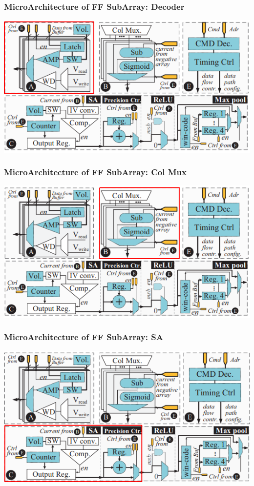 \documentclass[hyperref={colorlinks}]{beamer}
\begin{document}
\begin{frame}
	\frametitle{MicroArchitecture of FF SubArray: Decoder}
	\includegraphics[scale=0.4, center]{decoder1.png}
\end{frame}

\begin{frame}
	\frametitle{MicroArchitecture of FF SubArray: Col Mux}
	\includegraphics[scale=0.4, center]{col.png}
\end{frame}

\begin{frame}
	\frametitle{MicroArchitecture of FF SubArray: SA}
	\includegraphics[scale=0.4, center]{SA.png}
\end{frame}
\end{document}

